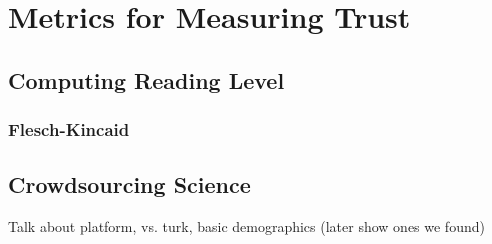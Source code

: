\chapter{Metrics for Measuring Trust}

\section{Computing Reading Level}
\subsection{Flesch-Kincaid}
\section{Crowdsourcing Science}
Talk about platform, vs. turk, basic demographics (later show ones we found) 
